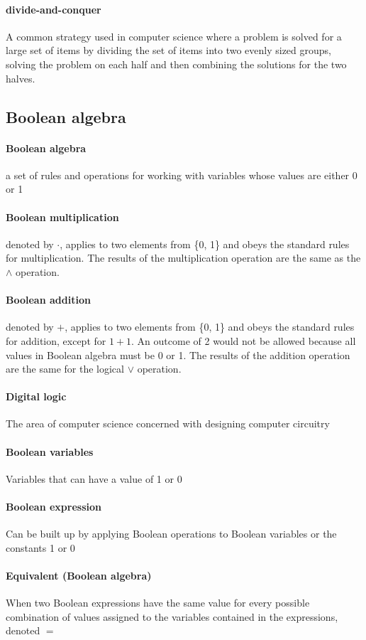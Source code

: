 \documentclass[a4paper]{article}
\begin{document}
\paragraph{divide-and-conquer} A common strategy used in computer science where a problem is solved for a large set of items by dividing the set of items into two evenly sized groups, solving the problem on each half and then combining the solutions for the two halves.
\pagebreak

\subsection{Boolean algebra}
\paragraph{Boolean algebra} a set of rules and operations for working with variables whose values are either 0 or 1
\paragraph{Boolean multiplication} denoted by $\cdot$, applies to two elements from \{0, 1\} and obeys the standard rules for multiplication. The results of the multiplication operation are the same as the $\land$ operation.
\paragraph{Boolean addition} denoted by $+$, applies to two elements from \{0, 1\} and obeys the standard rules for addition, except for $1 + 1$. An outcome of 2 would not be allowed because all values in Boolean algebra must be 0 or 1. The results of the addition operation are the same for the logical $\lor$ operation.
\paragraph{Digital logic}The area of computer science concerned with designing computer circuitry
\paragraph{Boolean variables} Variables that can have a value of 1 or 0
\paragraph{Boolean expression} Can be built up by applying Boolean operations to Boolean variables or the constants 1 or 0
\paragraph{Equivalent (Boolean algebra)}When two Boolean expressions have the same value for every possible combination of values assigned to the variables contained in the expressions, denoted $=$
\end{document}
